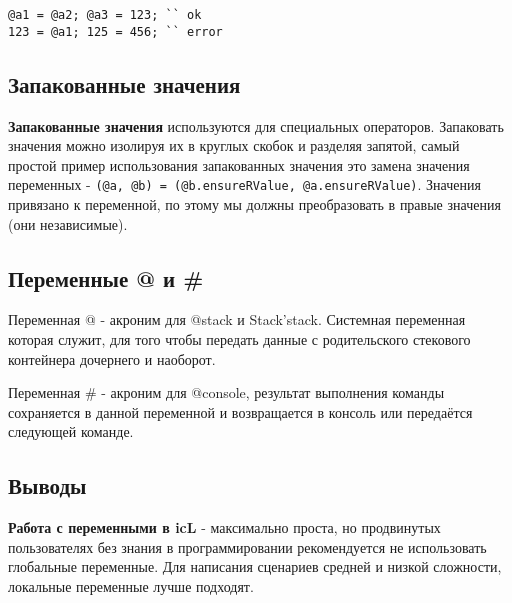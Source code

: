 \begin{sourcecode}
\label{rlvalues}
\begin{verbatim}
@a1 = @a2; @a3 = 123; `` ok
123 = @a1; 125 = 456; `` error
\end{verbatim}
\end{sourcecode}

\subsection{Запакованные значения}

{\bf Запакованные значения} используются для специальных операторов. Запаковать значения можно изолируя их в круглых скобок и разделяя запятой, самый простой пример использования запакованных значения это замена значения переменных - \texttt{(@a, @b) = (@b.ensureRValue, @a.ensureRValue)}. Значения привязано к переменной, по этому мы должны преобразовать в правые значения (они независимые).

\subsection{Переменные @ и \#}

{Переменная @} - акроним для @stack и Stack'stack. Системная переменная которая служит, для того чтобы передать данные с родительского стекового контейнера дочернего и наоборот. 

{Переменная \#} - акроним для @console, результат выполнения команды сохраняется в данной переменной и возвращается в консоль или передаётся следующей команде.

\subsection{Выводы}

{\bf Работа с переменными в icL} - максимально проста, но продвинутых пользователях без знания в программировании рекомендуется не использовать глобальные переменные. Для написания сценариев средней и низкой сложности, локальные переменные лучше подходят.
